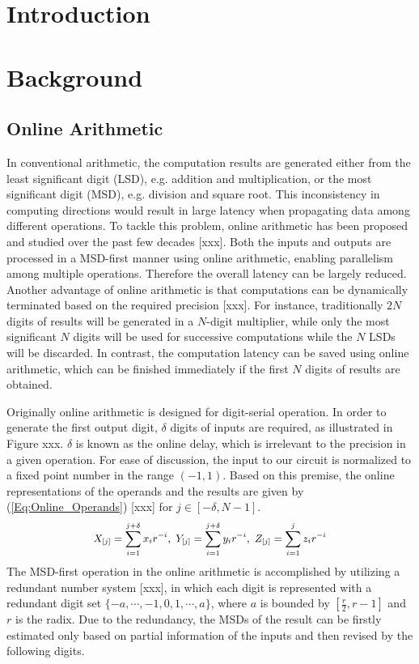 \documentclass{acm_proc_article-sp}
\begin{document}

\section{Introduction}

\section{Background}
\subsection{Online Arithmetic}
In conventional arithmetic, the computation results are generated either from the least significant digit (LSD), e.g. addition and multiplication, or the most significant digit (MSD), e.g. division and square root. This inconsistency in computing directions would result in large latency when propagating data among different operations. To tackle this problem, online arithmetic has been proposed and studied over the past few decades [xxx]. Both the inputs and outputs are processed in a MSD-first manner using online arithmetic, enabling parallelism among multiple operations. Therefore the overall latency can be largely reduced. Another advantage of online arithmetic is that computations can be dynamically terminated based on the required precision [xxx]. For instance, traditionally $2N$ digits of results will be generated in a $N$-digit multiplier, while only the most significant $N$ digits will be used for successive computations while the $N$ LSDs will be discarded. In contrast, the computation latency can be saved using online arithmetic, which can be finished immediately if the first $N$ digits of results are obtained.

Originally online arithmetic is designed for digit-serial operation. In order to generate the first output digit, $\delta$ digits of inputs are required, as illustrated in Figure xxx. $\delta$ is known as the online delay, which is irrelevant to the precision in a given operation. For ease of discussion, the input to our circuit is normalized to a fixed point number in the range $(-1,1)$. Based on this premise, the online representations of the operands and the results are given by (\ref{Eq:Online_Operands}) [xxx] for $j\in[-\delta,N-1]$.
%
\begin{eqnarray}\label{Eq:Online_Operands}
\footnotesize
  X_{[j]}=\sum_{i=1}^{j+\delta}x_ir^{-i},~Y_{[j]}=\sum_{i=1}^{j+\delta}y_ir^{-i},~Z_{[j]}=\sum_{i=1}^{j}z_ir^{-i}
\normalsize
\end{eqnarray}
%
The MSD-first operation in the online arithmetic is accomplished by utilizing a redundant number system [xxx], in which each digit is represented with a redundant digit set $\{-a,\cdots,-1,0,1,\cdots,a\}$, where $a$ is bounded by $[\frac{r}{2},r-1]$ and $r$ is the radix. Due to the redundancy, the MSDs of the result can be firstly estimated only based on partial information of the inputs and then revised by the following digits.
\end{document}
